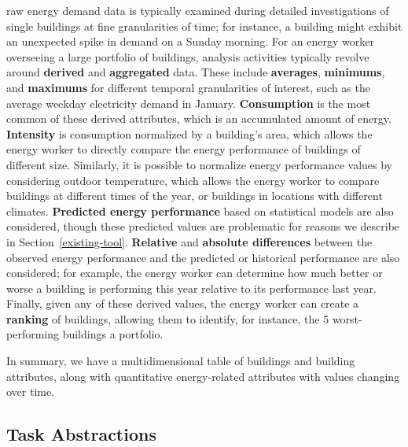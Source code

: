 \documentclass[journal]{vgtc}                %
\newcommand{\bstart}[1]{\vspace{1mm} \noindent{\textbf{#1:}}}
\begin{document}
\bstart{Derived data} raw energy demand data is typically examined during detailed investigations of single buildings at fine granularities of time; for instance, a building might exhibit an unexpected spike in demand on a Sunday morning. 
For an energy worker overseeing a large portfolio of buildings, analysis activities typically revolve around {\bf derived} and {\bf aggregated} data. 
These include {\bf averages}, {\bf minimums}, and {\bf maximums} for different temporal granularities of interest, such as the average weekday electricity demand in January.
{\bf Consumption} is the most common of these derived attributes, which is an accumulated amount of energy.
{\bf Intensity} is consumption normalized by a building's area, which allows the energy worker to directly compare the energy performance of buildings of different size.
Similarly, it is possible to normalize energy performance values by considering outdoor temperature, which allows the energy worker to compare buildings at different times of the year, or buildings in locations with different climates.
{\bf Predicted energy performance} based on statistical models are also considered, though these predicted values are problematic for reasons we describe in Section~\ref{existing-tool}.
{\bf Relative} and {\bf absolute differences} between the observed energy performance and the predicted or historical performance are also considered; for example, the energy worker can determine how much better or worse a building is performing this year relative to its performance last year.
Finally, given any of these derived values, the energy worker can create a {\bf ranking} of buildings, allowing them to identify, for instance, the 5 worst-performing buildings a portfolio.

In summary, we have a multidimensional table of buildings and building attributes, along with quantitative energy-related attributes with values changing over time.


\subsection{Task Abstractions}
\label{task-abstractions}

\end{document}
